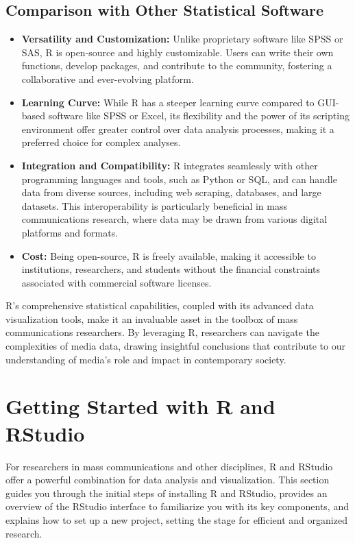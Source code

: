 \documentclass[
]{book}
\begin{document}
\hypertarget{comparison-with-other-statistical-software}{%
\subsection{Comparison with Other Statistical Software}\label{comparison-with-other-statistical-software}}

\begin{itemize}
\item
  \textbf{Versatility and Customization:} Unlike proprietary software like SPSS or SAS, R is open-source and highly customizable. Users can write their own functions, develop packages, and contribute to the community, fostering a collaborative and ever-evolving platform.
\item
  \textbf{Learning Curve:} While R has a steeper learning curve compared to GUI-based software like SPSS or Excel, its flexibility and the power of its scripting environment offer greater control over data analysis processes, making it a preferred choice for complex analyses.
\item
  \textbf{Integration and Compatibility:} R integrates seamlessly with other programming languages and tools, such as Python or SQL, and can handle data from diverse sources, including web scraping, databases, and large datasets. This interoperability is particularly beneficial in mass communications research, where data may be drawn from various digital platforms and formats.
\item
  \textbf{Cost:} Being open-source, R is freely available, making it accessible to institutions, researchers, and students without the financial constraints associated with commercial software licenses.
\end{itemize}

R's comprehensive statistical capabilities, coupled with its advanced data visualization tools, make it an invaluable asset in the toolbox of mass communications researchers. By leveraging R, researchers can navigate the complexities of media data, drawing insightful conclusions that contribute to our understanding of media's role and impact in contemporary society.

\hypertarget{getting-started-with-r-and-rstudio}{%
\section{Getting Started with R and RStudio}\label{getting-started-with-r-and-rstudio}}

For researchers in mass communications and other disciplines, R and RStudio offer a powerful combination for data analysis and visualization. This section guides you through the initial steps of installing R and RStudio, provides an overview of the RStudio interface to familiarize you with its key components, and explains how to set up a new project, setting the stage for efficient and organized research.
\end{document}
